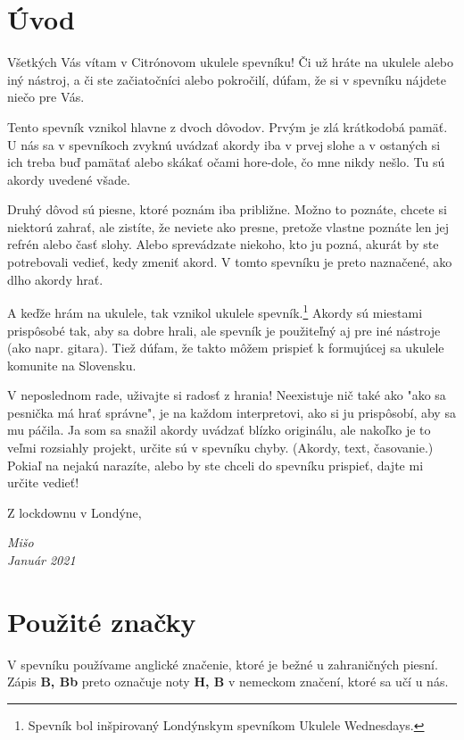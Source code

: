 \begingroup %
\setlength{\parindent}{0pt}
\setlength{\parskip}{\baselineskip}
\large

\section*{Úvod}

Všetkých Vás vítam v Citrónovom ukulele spevníku! Či už hráte na ukulele alebo iný nástroj,
a či ste začiatočníci alebo pokročilí, dúfam, že si v spevníku nájdete niečo pre Vás.

Tento spevník vznikol hlavne z dvoch dôvodov. Prvým je zlá krátkodobá pamäť. U nás sa v spevníkoch
zvyknú uvádzať akordy iba v prvej slohe a v ostaných si ich treba buď pamätať alebo skákať očami
hore-dole, čo mne nikdy nešlo. Tu sú akordy uvedené všade.

Druhý dôvod sú piesne, ktoré poznám iba približne. Možno to poznáte, chcete si niektorú zahrať,
ale zistíte, že neviete ako presne, pretože vlastne poznáte len jej refrén alebo časť slohy.
Alebo sprevádzate niekoho, kto ju pozná, akurát by ste potrebovali vedieť, kedy zmeniť akord.
V tomto spevníku je preto naznačené, ako dlho akordy hrať.

A keďže hrám na ukulele, tak vznikol ukulele spevník.\footnote{Spevník bol inšpirovaný Londýnskym
spevníkom Ukulele Wednesdays.} Akordy sú miestami prispôsobé tak, aby sa dobre hrali, ale spevník
je použiteľný aj pre iné nástroje (ako napr. gitara). Tiež dúfam, že takto môžem prispieť k formujúcej
sa ukulele komunite na Slovensku.

V neposlednom rade, uživajte si radosť z hrania! Neexistuje nič také ako "ako sa pesnička má hrať
správne", je na každom interpretovi, ako si ju prispôsobí, aby sa mu páčila. Ja som sa snažil
akordy uvádzať blízko originálu, ale nakoľko je to veľmi rozsiahly projekt, určite sú v spevníku chyby.
(Akordy, text, časovanie.) Pokiaľ na nejakú narazíte, alebo by ste chceli do spevníku prispieť, dajte
mi určite vedieť!

Z lockdownu v Londýne,

\textit{%
Mišo \\
Január 2021
}

\section*{Použité značky}

V spevníku používame anglické značenie, ktoré je bežné u zahraničných piesní. Zápis \textbf{B, Bb}
preto označuje noty \textbf{H, B} v nemeckom značení, ktoré sa učí u nás.

